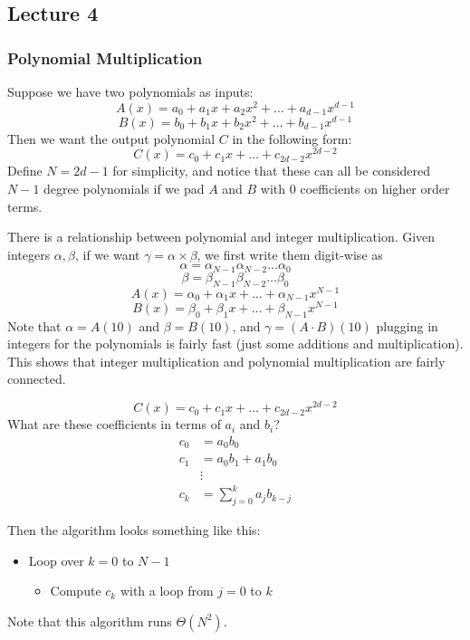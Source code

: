 \subsection{Lecture 4}

\subsubsection{Polynomial Multiplication}
Suppose we have two polynomials as inputs:
\[ A(x) = a_0 + a_1x + a_2x^2 + \dots + a_{d-1}x^{d-1} \]
\[ B(x) = b_0 + b_1x + b_2x^2 + \dots + b_{d-1}x^{d-1} \]
Then we want the output polynomial $C$ in the following form:
\[ C(x) = c_0 + c_1x + \dots + c_{2d - 2}x^{2d - 2} \]
Define $N = 2d - 1$ for simplicity, and notice that these can all be considered $N - 1$ degree polynomials
if we pad $A$ and $B$ with 0 coefficients on higher order terms.

There is a relationship between polynomial and integer multiplication.
Given integers $\alpha, \beta$, if we want $\gamma = \alpha \times \beta$, we first write them digit-wise as
\[ \alpha = \alpha_{N - 1} \alpha_{N-2} \dots \alpha_0 \]
\[ \beta = \beta_{N - 1} \beta_{N-2} \dots \beta_0\]
\[ A(x) = \alpha_0 + \alpha_1 x + \dots + \alpha_{N-1}x^{N-1} \]
\[ B(x) = \beta_0+ \beta_1x + \dots + \beta_{N-1}x^{N-1} \]
Note that $\alpha = A(10)$ and $\beta = B(10)$, and $\gamma = (A \cdot B)(10)$
plugging in integers for the polynomials is fairly fast (just some additions and multiplication).
This shows that integer multiplication and polynomial multiplication are fairly connected.

\begin{algothm} 
    \[ C(x) = c_0 + c_1x + \dots + c_{2d - 2}x^{2d - 2} \]
    What are these coefficients in terms of $a_i$ and $b_i$?
    \begin{align*} 
        c_0 &= a_0 b_0 \\
        c_1 &= a_0 b_1 + a_1 b_0 \\
        &\vdots \\
        c_k &= \sum_{j = 0}^k a_j b_{k - j}
    \end{align*}

    Then the algorithm looks something like this:
    \begin{itemize}
        \item Loop over $k = 0$ to $N - 1$
        \begin{itemize}
            \item Compute $c_k$ with a loop from $j = 0$ to $k$
        \end{itemize}
    \end{itemize}

    Note that this algorithm runs $\Theta(N^2)$.
\end{algothm}

